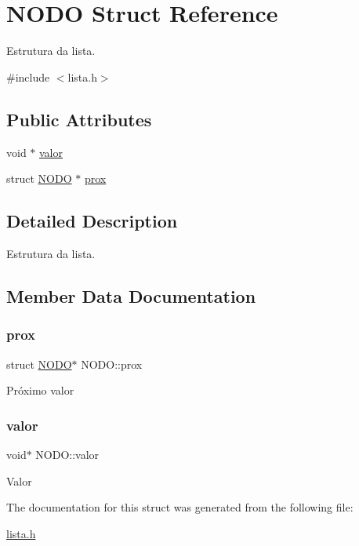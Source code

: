 \hypertarget{struct_n_o_d_o}{}\section{N\+O\+DO Struct Reference}
\label{struct_n_o_d_o}


Estrutura da lista.  




{\ttfamily \#include $<$lista.\+h$>$}

\subsection*{Public Attributes}
\begin{DoxyCompactItemize}
\item 
void $\ast$ \hyperlink{struct_n_o_d_o_a7295ec923d6d0ffeed534d397f49f535}{valor}
\item 
struct \hyperlink{struct_n_o_d_o}{N\+O\+DO} $\ast$ \hyperlink{struct_n_o_d_o_a78014339586cd5cc8579603c69d3e301}{prox}
\end{DoxyCompactItemize}


\subsection{Detailed Description}
Estrutura da lista. 

\subsection{Member Data Documentation}
\mbox{\label{struct_n_o_d_o_a78014339586cd5cc8579603c69d3e301}} 
\subsubsection{\texorpdfstring{prox}{prox}}
{\footnotesize\ttfamily struct \hyperlink{struct_n_o_d_o}{N\+O\+DO}$\ast$ N\+O\+D\+O\+::prox}

Próximo valor \mbox{\label{struct_n_o_d_o_a7295ec923d6d0ffeed534d397f49f535}} 
\subsubsection{\texorpdfstring{valor}{valor}}
{\footnotesize\ttfamily void$\ast$ N\+O\+D\+O\+::valor}

Valor 

The documentation for this struct was generated from the following file\+:\begin{DoxyCompactItemize}
\item 
\hyperlink{lista_8h}{lista.\+h}\end{DoxyCompactItemize}
